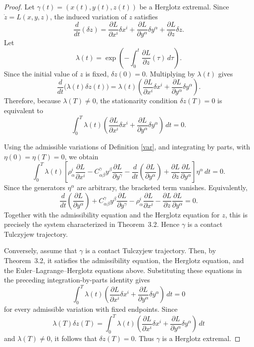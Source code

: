 \documentclass[10pt,a4paper]{amsart}
\begin{document}
\begin{proof}
Let \(\gamma(t)=(x(t),y(t),z(t))\) be a Herglotz extremal. Since
\(\dot z=L(x,y,z)\), the induced variation of \(z\) satisfies
\[
\frac{d}{dt}(\delta z)
=
\frac{\partial L}{\partial x^i}\delta x^i
+
\frac{\partial L}{\partial y^\alpha}\delta y^\alpha
+
\frac{\partial L}{\partial z}\delta z .
\]
Let
\[
\lambda(t)=
\exp\left(
-\int_0^t
\frac{\partial L}{\partial z}(\tau)\,d\tau
\right).
\]
Since the initial value of \(z\) is fixed, \(\delta z(0)=0\). Multiplying by
\(\lambda(t)\) gives
\[
\frac{d}{dt}\bigl(\lambda(t)\delta z(t)\bigr)
=
\lambda(t)
\left(
\frac{\partial L}{\partial x^i}\delta x^i
+
\frac{\partial L}{\partial y^\alpha}\delta y^\alpha
\right).
\]
Therefore, because \(\lambda(T)\neq 0\), the stationarity condition
\(\delta z(T)=0\) is equivalent to
\[
\int_0^T
\lambda(t)
\left(
\frac{\partial L}{\partial x^i}\delta x^i
+
\frac{\partial L}{\partial y^\alpha}\delta y^\alpha
\right)\,dt=0.
\]

Using the admissible variations of Definition \ref{var}, and integrating by parts, with \(\eta(0)=\eta(T)=0\), we obtain
\[
\int_0^T
\lambda(t)
\left[
\rho^i_\alpha\frac{\partial L}{\partial x^i}
-
C^\gamma_{\alpha\beta}y^\beta
\frac{\partial L}{\partial y^\gamma}
-
\frac{d}{dt}
\left(
\frac{\partial L}{\partial y^\alpha}
\right)
+
\frac{\partial L}{\partial z}
\frac{\partial L}{\partial y^\alpha}
\right]
\eta^\alpha\,dt=0 .
\]
Since the generators \(\eta^\alpha\) are arbitrary, the bracketed term vanishes.
Equivalently,
\[
\frac{d}{dt}
\left(
\frac{\partial L}{\partial y^\alpha}
\right)
+
C^\gamma_{\alpha\beta}y^\beta
\frac{\partial L}{\partial y^\gamma}
-
\rho^i_\alpha
\frac{\partial L}{\partial x^i}
-
\frac{\partial L}{\partial z}
\frac{\partial L}{\partial y^\alpha}
=0 .
\]
Together with the admissibility equation and the Herglotz equation for \(z\), this
is precisely the system characterized in Theorem~3.2. Hence \(\gamma\) is a
contact Tulczyjew trajectory.

Conversely, assume that \(\gamma\) is a contact Tulczyjew trajectory. Then, by
Theorem~3.2, it satisfies the admissibility equation, the Herglotz equation, and
the Euler--Lagrange--Herglotz equations above. Substituting these equations in the
preceding integration-by-parts identity gives
\[
\int_0^T
\lambda(t)
\left(
\frac{\partial L}{\partial x^i}\delta x^i
+
\frac{\partial L}{\partial y^\alpha}\delta y^\alpha
\right)\,dt=0
\]
for every admissible variation with fixed endpoints. Since
\[
\lambda(T)\delta z(T)
=
\int_0^T
\lambda(t)
\left(
\frac{\partial L}{\partial x^i}\delta x^i
+
\frac{\partial L}{\partial y^\alpha}\delta y^\alpha
\right)\,dt
\]
and \(\lambda(T)\neq 0\), it follows that \(\delta z(T)=0\). Thus \(\gamma\) is a
Herglotz extremal.
\end{proof}
\end{document}
